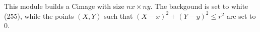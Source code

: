 This module builds a Cimage with size $nx \times ny$.
The backgound is set to white (255), while 
the points $(X,Y)$ such that $(X-x)^2+(Y-y)^2\leq r^2$ are set to 0.
